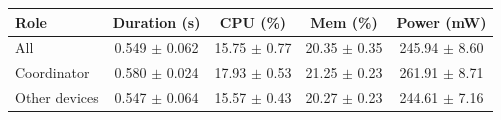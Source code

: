 \begin{tabular}{lcccc}
\hline
\textbf{Role} & \textbf{Duration (s)} & \textbf{CPU (\%)} & \textbf{Mem (\%)} & \textbf{Power (mW)} \\
\hline
All & 0.549 $\pm$ 0.062 & 15.75 $\pm$ 0.77 & 20.35 $\pm$ 0.35 & 245.94 $\pm$ 8.60 \\
Coordinator & 0.580 $\pm$ 0.024 & 17.93 $\pm$ 0.53 & 21.25 $\pm$ 0.23 & 261.91 $\pm$ 8.71 \\
Other devices & 0.547 $\pm$ 0.064 & 15.57 $\pm$ 0.43 & 20.27 $\pm$ 0.23 & 244.61 $\pm$ 7.16 \\
\hline
\end{tabular}
